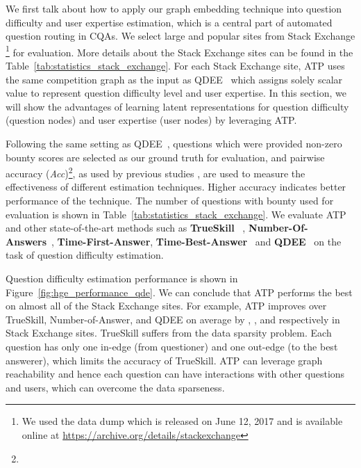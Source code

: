 \documentclass[letterpaper]{article} \usepackage{aaai19}  \usepackage{times}  \usepackage{helvet}  \usepackage{courier}  \usepackage{url}  \usepackage{graphicx}  \usepackage{booktabs} \usepackage{xcolor}
\begin{document}
We first talk about how to apply our graph embedding technique into question difficulty and user expertise estimation, which is a central part of automated question routing in CQAs. We select  large and popular sites from Stack Exchange \footnote{We used the data dump which is released on June 12, 2017 and is available online at \url{https://archive.org/details/stackexchange}} for evaluation. More details about the Stack Exchange sites can be found in the Table~\ref{tab:statistics_stack_exchange}. For each Stack Exchange site, ATP uses the same competition graph as the input as QDEE~\cite{QDEE2018} which assigns solely scalar value to represent question difficulty level and user expertise. In this section, we will show the advantages of learning latent representations for question difficulty (question nodes) and user expertise (user nodes) by leveraging ATP. 









 Following the same setting as QDEE~\cite{QDEE2018}, questions which were provided non-zero bounty scores are selected as our ground truth for evaluation, and pairwise accuracy (\textit{Acc})\footnote{}, as used by previous studies \cite{wang2014,QDEE2018}, are used to measure the effectiveness of different estimation techniques. Higher accuracy indicates better performance of the technique. The number of questions with bounty used for evaluation is shown in Table~\ref{tab:statistics_stack_exchange}. We evaluate ATP and other state-of-the-art methods such as {\bf TrueSkill} ~\cite{wang2014}, {\bf Number-Of-Answers}~\cite{yang2014sparrows}, {\bf Time-First-Answer},  {\bf Time-Best-Answer}~\cite{Huna2016} and {\bf QDEE}~\cite{QDEE2018} on the task of question difficulty estimation. 

Question difficulty estimation performance is shown in Figure~\ref{fig:hge_performance_qde}.
We can conclude that { ATP} performs the best on almost all of the Stack Exchange sites. For example, { ATP} improves over { TrueSkill}, { Number-of-Answer}, and { QDEE} on average by , , and  respectively in  Stack Exchange sites. { TrueSkill} suffers from the data sparsity problem. Each question has only one in-edge (from questioner) and one out-edge (to the best answerer), which limits the accuracy of { TrueSkill}. { ATP} can leverage graph reachability and hence each question can have interactions with other questions and users, which can overcome the data sparseness. 
\end{document}
